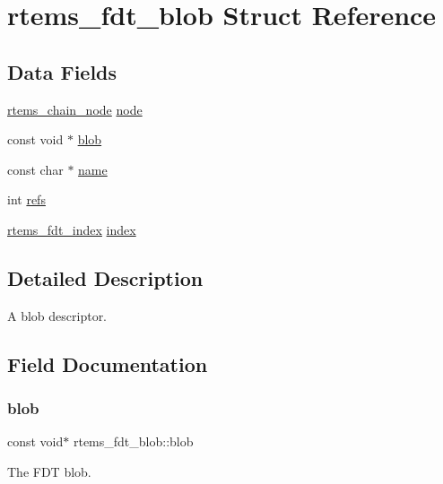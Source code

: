 \hypertarget{structrtems__fdt__blob}{}\section{rtems\+\_\+fdt\+\_\+blob Struct Reference}
\label{structrtems__fdt__blob}
\subsection*{Data Fields}
\begin{DoxyCompactItemize}
\item 
\mbox{\hyperlink{structChain__Node__struct}{rtems\+\_\+chain\+\_\+node}} \mbox{\hyperlink{structrtems__fdt__blob_a1d6846a217c9cbac57a2a0946c6fc82b}{node}}
\item 
const void $\ast$ \mbox{\hyperlink{structrtems__fdt__blob_a77de9b559d5c7eda5587ed48e6694c39}{blob}}
\item 
const char $\ast$ \mbox{\hyperlink{structrtems__fdt__blob_ad16c5ea5def721aced5a6f8109ae4092}{name}}
\item 
int \mbox{\hyperlink{structrtems__fdt__blob_a628d2916f0fd6de43d41e08f4098ab64}{refs}}
\item 
\mbox{\hyperlink{structrtems__fdt__index}{rtems\+\_\+fdt\+\_\+index}} \mbox{\hyperlink{structrtems__fdt__blob_aed548b10df307302bc806e7c8342342a}{index}}
\end{DoxyCompactItemize}


\subsection{Detailed Description}
A blob descriptor. 

\subsection{Field Documentation}
\mbox{\label{structrtems__fdt__blob_a77de9b559d5c7eda5587ed48e6694c39}} 
\subsubsection{\texorpdfstring{blob}{blob}}
{\footnotesize\ttfamily const void$\ast$ rtems\+\_\+fdt\+\_\+blob\+::blob}

The F\+DT blob. \mbox{\label{structrtems__fdt__blob_aed548b10df307302bc806e7c8342342a}} 
